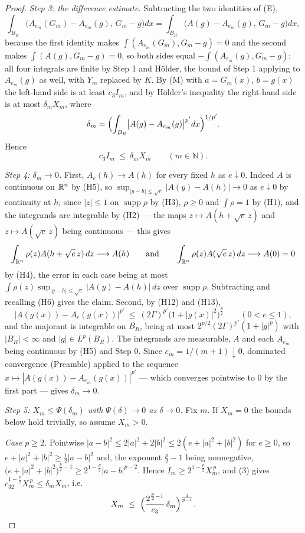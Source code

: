 \begin{proof}
\emph{Step 3: the difference estimate.}  Subtracting the two identities of (E),
\[
\int_{B_R}\bigl(A_{e_m}(G_m)-A_{e_m}(g),\,G_m-g\bigr)dx
=\int_{B_R}\bigl(A(g)-A_{e_m}(g),\,G_m-g\bigr)dx ,
\]
because the first identity makes $\int(A_{e_m}(G_m),G_m-g)=0$ and the second
makes $\int(A(g),G_m-g)=0$, so both sides equal
$-\int(A_{e_m}(g),G_m-g)$; all four integrals are finite by Step 1 and Hölder,
the bound of Step 1 applying to $A_{e_m}(g)$ as well, with $Y_m$ replaced by
$K$.  By (M) with $a=G_m(x)$, $b=g(x)$ the left-hand side is at least $c_3I_m$,
and by Hölder's inequality the right-hand side is at most $\delta_mX_m$, where
\[
\delta_m=\Bigl(\int_{B_R}\bigl|A(g)-A_{e_m}(g)\bigr|^{p'}dx\Bigr)^{1/p'} .
\]
Hence
\[
c_3I_m\ \le\ \delta_mX_m\qquad(m\in\mathbb{N}).
\tag{3}
\]

\emph{Step 4: $\delta_m\to0$.}  First, $A_e(h)\to A(h)$ for every fixed $h$ as
$e\downarrow0$.  Indeed $A$ is continuous on $\mathbb{R}^n$ by (H5), so
$\sup_{|y-h|\le\sqrt e}|A(y)-A(h)|\to0$ as $e\downarrow0$ by continuity at $h$;
since $|z|\le1$ on $\operatorname{supp}\rho$ by (H3), $\rho\ge0$ and
$\int\rho=1$ by (H1), and the integrands are integrable by (H2) --- the maps
$z\mapsto A(h+\sqrt e\,z)$ and $z\mapsto A(\sqrt e\,z)$ being continuous ---
this gives
\[
\int_{\mathbb{R}^n}\rho(z)A(h+\sqrt e\,z)\,dz\longrightarrow A(h)
\qquad\text{and}\qquad
\int_{\mathbb{R}^n}\rho(z)A(\sqrt e\,z)\,dz\longrightarrow A(0)=0
\]
by (H4), the error in each case being at most
$\int\rho(z)\sup_{|y-h|\le\sqrt e}|A(y)-A(h)|\,dz$ over
$\operatorname{supp}\rho$.  Subtracting and recalling (H6) gives the claim.
Second, by (H12) and (H13),
\[
\bigl|A(g(x))-A_{e}(g(x))\bigr|^{p'}
\ \le\ (2\Gamma)^{p'}\bigl(1+|g(x)|^2\bigr)^{\frac p2}
\qquad(0<e\le1),
\]
and the majorant is integrable on $B_R$, being at most
$2^{p/2}(2\Gamma)^{p'}(1+|g|^p)$ with $|B_R|<\infty$ and $|g|\in L^p(B_R)$.  The
integrands are measurable, $A$ and each $A_{e_m}$ being continuous by (H5) and
Step 0.  Since $e_m=1/(m+1)\downarrow0$, dominated convergence (Preamble)
applied to the sequence $x\mapsto|A(g(x))-A_{e_m}(g(x))|^{p'}$ --- which
converges pointwise to $0$ by the first part --- gives $\delta_m\to0$.

\emph{Step 5: $X_m\le\Psi(\delta_m)$ with $\Psi(\delta)\to0$ as $\delta\to0$.}
Fix $m$.  If $X_m=0$ the bounds below hold trivially, so assume $X_m>0$.

\emph{Case $p\ge2$.}  Pointwise $|a-b|^2\le2|a|^2+2|b|^2\le2(e+|a|^2+|b|^2)$ for
$e\ge0$, so $e+|a|^2+|b|^2\ge\frac12|a-b|^2$ and, the exponent $\frac p2-1$
being nonnegative,
$\bigl(e+|a|^2+|b|^2\bigr)^{\frac p2-1}\ge2^{1-\frac p2}|a-b|^{p-2}$.  Hence
$I_m\ge2^{1-\frac p2}X_m^{\,p}$, and (3) gives
$c_32^{1-\frac p2}X_m^{\,p}\le\delta_mX_m$, i.e.
\[
X_m\ \le\ \Bigl(\frac{2^{\frac p2-1}}{c_3}\,\delta_m\Bigr)^{\frac1{p-1}} .
\]


\end{proof}
